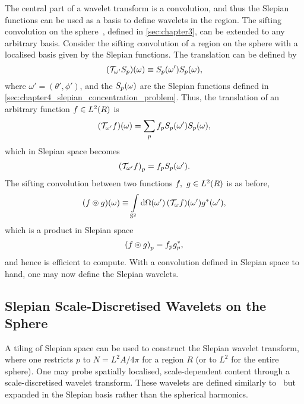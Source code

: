 The central part of a wavelet transform is a convolution, and thus the Slepian functions can be used as a basis to define wavelets in the region.
The sifting convolution on the sphere~\cite{Roddy2021}, defined in \cref{sec:chapter3}, can be extended to any arbitrary basis.
Consider the sifting convolution of a region on the sphere with a localised basis given by the Slepian functions.
The translation can be defined by
%
\begin{equation}
	\pixel{(\translation{\omega'}\slepian{S})}
	\equiv \pixel[']{\slepian{S}} \pixel{\slepian{S}},
\end{equation}
%
where \(\omega'=(\theta',\phi')\), and the \(\pixel{\slepian{S}}\) are the Slepian functions defined in \cref{sec:chapter4_slepian_concentration_problem}.
Thus, the translation of an arbitrary function \(f \in \hilbert{R}\) is
%
\begin{equation}
	\pixel{(\translation{\omega'}f)} = \slepianSum \slepian{f} \pixel[']{\slepian{S}} \pixel{\slepian{S}},
\end{equation}
%
which in Slepian space becomes
%
\begin{equation}
	\slepian{(\translation{\omega'}f)} = \slepian{f} \pixel[']{\slepian{S}}.
\end{equation}
%
The sifting convolution between two functions \(f,\ g \in \hilbert{R}\) is as before, \ie{}
%
\begin{equation}
	\pixel{\convolution{f}{g}}
	\equiv \integrateSphere{\omega'} \pixel[']{(\translation{\omega}f)} \pixel[']{\conj{g}},
\end{equation}
%
which is a product in Slepian space
%
\begin{equation}
	\slepian{\convolution{f}{g}}
	= \slepian{f} \conj{\slepian{g}},
\end{equation}
%
and hence is efficient to compute.
With a convolution defined in Slepian space to hand, one may now define the Slepian wavelets.

\subsection{Slepian Scale-Discretised Wavelets on the Sphere}\label{sec:chapter4_slepian_scale_discretised_wavelets_sphere}

A tiling of Slepian space can be used to construct the Slepian wavelet transform, where one restricts \(p\) to \(N=L^{2}A/4\pi{}\) for a region \(R\) (or to \(L^{2}\) for the entire sphere).
One may probe spatially localised, scale-dependent content through a scale-discretised wavelet transform.
These wavelets are defined similarly to~\cite{Wiaux2008,McEwen2018} but expanded in the Slepian basis rather than the spherical harmonics.

